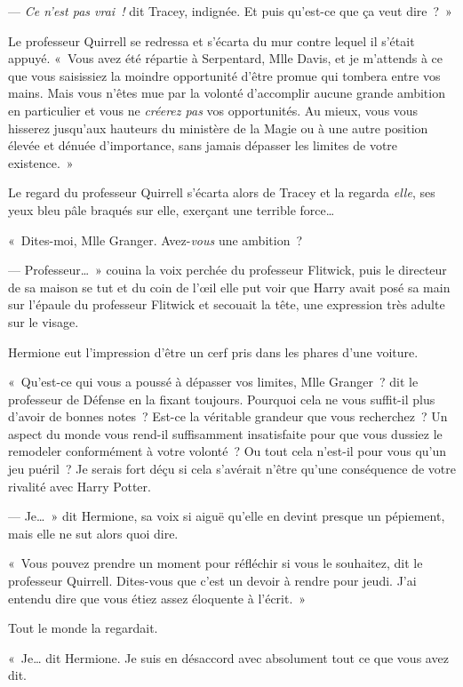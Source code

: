 --- \emph{Ce n'est pas vrai~!}  dit Tracey, indignée. Et puis qu'est-ce que ça veut dire~?~»

Le professeur Quirrell se redressa et s'écarta du mur contre lequel il s'était appuyé. «~Vous avez été répartie à Serpentard, Mlle Davis, et je m'attends à ce que vous saisissiez la moindre opportunité d'être promue qui tombera entre vos mains. Mais vous n'êtes mue par la volonté d'accomplir aucune grande ambition en particulier et vous ne \emph{créerez pas} vos opportunités. Au mieux, vous vous hisserez jusqu'aux hauteurs du ministère de la Magie ou à une autre position élevée et dénuée d'importance, sans jamais dépasser les limites de votre existence.~»

Le regard du professeur Quirrell s'écarta alors de Tracey et la regarda \emph{elle}, ses yeux bleu pâle braqués sur elle, exerçant une terrible force…

«~Dites-moi, Mlle Granger. Avez-\emph{vous} une ambition~?

--- Professeur…~» couina la voix perchée du professeur Flitwick, puis le directeur de sa maison se tut et du coin de l'œil elle put voir que Harry avait posé sa main sur l'épaule du professeur Flitwick et secouait la tête, une expression très adulte sur le visage.

Hermione eut l'impression d'être un cerf pris dans les phares d'une voiture.

«~Qu'est-ce qui vous a poussé à dépasser vos limites, Mlle Granger~? dit le professeur de Défense en la fixant toujours. Pourquoi cela ne vous suffit-il plus d'avoir de bonnes notes~? Est-ce la véritable grandeur que vous recherchez~? Un aspect du monde vous rend-il suffisamment insatisfaite pour que vous dussiez le remodeler conformément à votre volonté~? Ou tout cela n'est-il pour vous qu'un jeu puéril~? Je serais fort déçu si cela s'avérait n'être qu'une conséquence de votre rivalité avec Harry Potter.

--- Je…~» dit Hermione, sa voix si aiguë qu'elle en devint presque un pépiement, mais elle ne sut alors quoi dire.

«~Vous pouvez prendre un moment pour réfléchir si vous le souhaitez, dit le professeur Quirrell. Dites-vous que c'est un devoir à rendre pour jeudi. J'ai entendu dire que vous étiez assez éloquente à l'écrit.~»

Tout le monde la regardait.

«~Je… dit Hermione. Je suis en désaccord avec absolument tout ce que vous avez dit.

